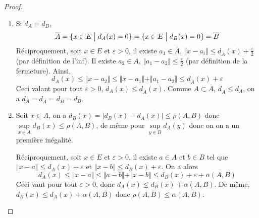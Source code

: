 \begin{proof}
	\phantom{}
	\begin{enumerate}
		\item Si $d_{A}=d_{B}$, 
		\begin{equation}\overline{A}=\{x\in E\bigm| d_{A}(x)=0\}=\{x\in E\bigm| d_{B}(x)=0\}=\overline{B}\end{equation}
		Réciproquement, soit $x\in E$ et $\varepsilon>0$, il existe $a_{1}\in\overline{A}$, $\Vert x-a_{i}\Vert\leqslant d_{\overline{A}}(x)+\frac{\varepsilon}{2}$ (par définition de l'inf). Il existe $a_{2}\in A$, $\Vert a_{1}-a_{2}\Vert\leqslant\frac{\varepsilon}{2}$ (par définition de la fermeture). Ainsi,
		\begin{equation}d_{A}(x)\leqslant\Vert x-a_{2}\Vert\leqslant\Vert x-a_{1}\Vert+\Vert a_{1}-a_{2}\Vert\leqslant d_{\overline{A}}(x)+\varepsilon\end{equation}
		Ceci valant pour tout $\varepsilon>0$, $d_{A}(x)\leqslant d_{\overline{A}}(x)$. Comme $A\subset\overline{A}$, $d_{\overline{A}}\leqslant d_{A}$, on a $d_{A}=d_{\overline{A}}=d_{\overline{B}}=d_{B}$.

		\item Soit $x\in A$, on a $d_{B}(x)=\vert d_{B}(x)-d_{A}(x)\vert\leqslant\rho(A,B)$ donc $\sup\limits_{x\in A}d_{B}(x)\leqslant\rho(A,B)$, de même pour $\sup\limits_{y\in B}d_{A}(y)$ donc on on a un première inégalité.
		
		Réciproquement, soit $x\in E$ et $\varepsilon>0$, il existe $a\in A$ et $b\in B$ tel que $\Vert x-a\Vert\leqslant d_{A}(x)+\varepsilon$ et $\Vert x-b\Vert\leqslant d_{B}(x)+\varepsilon$.
		On a alors
		\begin{equation}d_{A}(x)\leqslant\Vert x-a\Vert\leqslant\Vert a-b\Vert+\Vert x-b\Vert\leqslant d_{B}(x)+\varepsilon+\alpha(A,B)\end{equation}
		Ceci vaut pour tout $\varepsilon>0$, donc $d_{A}(x)\leqslant d_{B}(x)+\alpha(A,B)$. De même, $d_{B}(x)\leqslant d_{A}(x)+\alpha(A,B)$ donc $\rho(A,B)\leqslant\alpha(A,B)$.
	\end{enumerate}
\end{proof}

